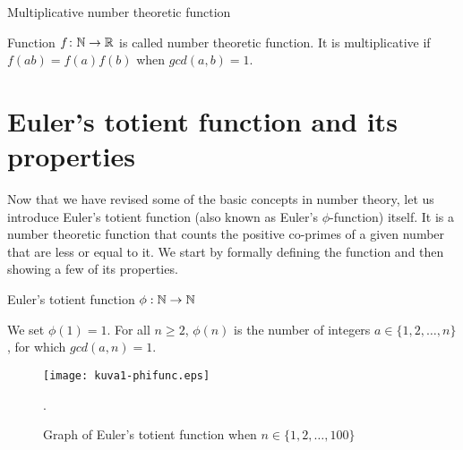\documentclass{article}
\begin{document}
\begin{definition}
Multiplicative number theoretic function

Function $f\colon \mathbb{N} \rightarrow \mathbb{R}$ is called number theoretic function. It is multiplicative if $f(ab) = f(a)f(b)$ when $gcd(a, b)=1$.

\end{definition}

\section{Euler's totient function and its properties}

Now that we have revised some of the basic concepts in number theory, let us introduce Euler's totient function (also known as Euler's $\phi$-function) itself. It is a number theoretic function that counts the positive co-primes of a given number that are less or equal to it. We start by formally defining the function and then showing a few of its properties.

\begin{definition}
Euler's totient function $\phi: \mathbb{N} \rightarrow \mathbb{N}$

We set $\phi(1) = 1$. For all $n \geq 2$, $\phi(n)$ is the number of integers $a \in \{1,2,\dots,n\}$, for which $gcd(a,n) = 1$.

\end{definition}


\begin{figure}[!htb]
    \centering
    \texttt{[image: kuva1-phifunc.eps]}
    \caption{Graph of Euler's totient function when $n\in\{1,2,\dots,100\}$}.
    \label{fig:k1}
\end{figure}

\clearpage
\end{document}
